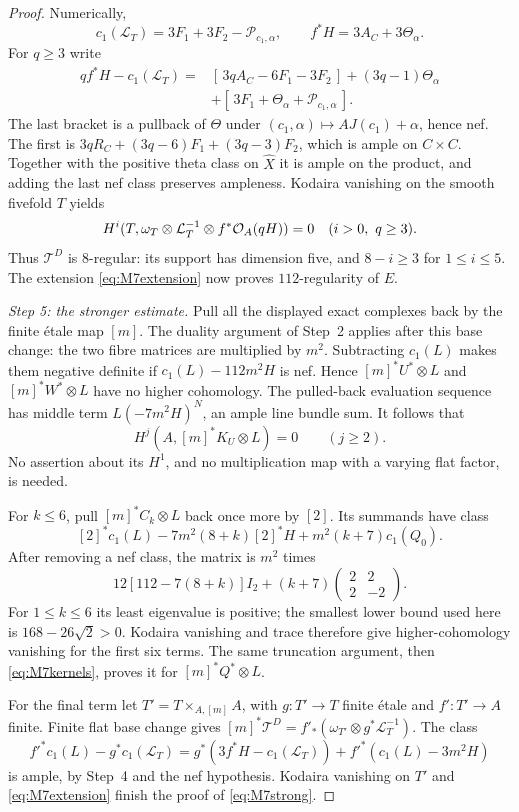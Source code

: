 \begin{proof}
Numerically,
\[
 c_1(\mathcal L_T)=3F_1+3F_2-\mathcal P_{c_1,\alpha},
 \qquad f^*H=3A_C+3\Theta_\alpha.
\]
For $q\ge3$ write
\begin{align*}
 qf^*H-c_1(\mathcal L_T)
  ={}&[\,3qA_C-6F_1-3F_2\,]+(3q-1)\Theta_\alpha\\
    &+[\,3F_1+\Theta_\alpha+\mathcal P_{c_1,\alpha}\,].
\end{align*}
The last bracket is a pullback of $\Theta$ under
$(c_1,\alpha)\mapsto AJ(c_1)+\alpha$, hence nef.
The first is
$3qR_C+(3q-6)F_1+(3q-3)F_2$, which is ample on $C\times C$.
Together with the positive theta class on $\widehat X$ it is ample
on the product, and adding the last nef class preserves ampleness.
Kodaira vanishing on the smooth fivefold $T$ yields
\[
 H^i(T,\omega_T\otimes\mathcal L_T^{-1}\otimes f^*\mathcal O_A(qH))=0
 \quad(i>0,\ q\ge3).
\]
Thus $\mathcal T^D$ is $8$-regular: its support has dimension five,
and $8-i\ge3$ for $1\le i\le5$.
The extension \eqref{eq:M7extension} now proves
$112$-regularity of $E$.

\emph{Step 5: the stronger estimate.}
Pull all the displayed exact complexes back by the finite \'etale
map $[m]$. The duality argument of Step~2 applies after this base
change: the two fibre matrices are multiplied by $m^2$.
Subtracting $c_1(L)$ makes them negative definite if
$c_1(L)-112m^2H$ is nef. Hence $[m]^*U^*\otimes L$ and
$[m]^*W^*\otimes L$ have no higher cohomology.
The pulled-back evaluation sequence has middle term
$L(-7m^2H)^N$, an ample line bundle sum. It follows that
\[
 H^j(A,[m]^*K_U\otimes L)=0\qquad(j\ge2).
\]
No assertion about its $H^1$, and no multiplication map with a
varying flat factor, is needed.

For $k\le6$, pull $[m]^*C_k\otimes L$ back once more by $[2]$.
Its summands have class
\[
 [2]^*c_1(L)-7m^2(8+k)[2]^*H+m^2(k+7)c_1(Q_0).
\]
After removing a nef class, the matrix is $m^2$ times
\[
 12[112-7(8+k)]I_2+
       (k+7)\begin{pmatrix}2&2\\2&-2\end{pmatrix}.
\]
For $1\le k\le6$ its least eigenvalue is positive; the smallest
lower bound used here is $168-26\sqrt2>0$.
Kodaira vanishing and trace therefore give higher-cohomology
vanishing for the first six terms. The same truncation argument,
then \eqref{eq:M7kernels}, proves it for $[m]^*Q^*\otimes L$.

For the final term let $T'=T\times_{A,[m]}A$, with
$g:T'\to T$ finite \'etale and $f':T'\to A$ finite.
Finite flat base change gives
$[m]^*\mathcal T^D=f'_*(\omega_{T'}\otimes g^*\mathcal L_T^{-1})$.
The class
\[
 f'^*c_1(L)-g^*c_1(\mathcal L_T)
 =g^*(3f^*H-c_1(\mathcal L_T))
       +f'^*(c_1(L)-3m^2H)
\]
is ample, by Step~4 and the nef hypothesis.
Kodaira vanishing on $T'$ and
\eqref{eq:M7extension} finish the proof of \eqref{eq:M7strong}.
\end{proof}

